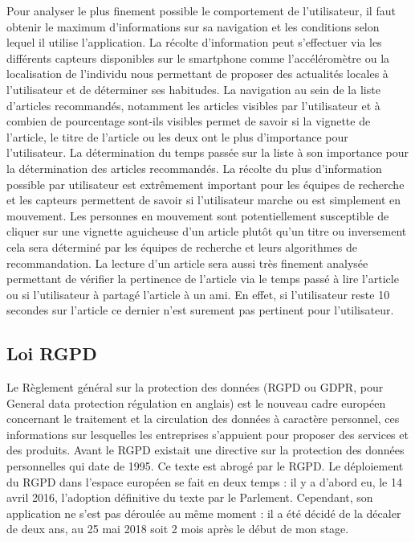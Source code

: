 Pour analyser le plus finement possible le comportement de l’utilisateur, il faut obtenir le maximum d’informations sur sa navigation et les conditions selon lequel il utilise l’application.  La récolte d’information peut s’effectuer via les différents capteurs disponibles sur le smartphone comme l’accéléromètre ou la localisation de l’individu nous permettant de proposer des actualités locales à l’utilisateur et de déterminer ses habitudes. La navigation au sein de la liste d’articles recommandés, notamment les articles visibles par l’utilisateur et à combien de pourcentage sont-ils visibles permet de savoir si la vignette de l’article, le titre de l’article ou les deux ont le plus d’importance pour l’utilisateur.  La détermination du temps passée sur la liste à son importance pour la détermination des articles recommandés.  
La récolte du plus d’information possible par utilisateur est extrêmement important pour les équipes de recherche et les capteurs permettent de savoir si l'utilisateur marche ou est simplement en mouvement. Les personnes en mouvement sont potentiellement susceptible de cliquer sur une vignette aguicheuse d’un article plutôt qu’un titre ou inversement cela sera déterminé par les équipes de recherche et leurs algorithmes de recommandation. La lecture d’un article sera aussi très finement analysée permettant de vérifier la pertinence de l’article via le temps passé à lire l’article ou si l’utilisateur à partagé l’article à un ami. En effet, si l’utilisateur reste 10 secondes sur l’article ce dernier n’est surement pas pertinent pour l’utilisateur.



\subsection{Loi RGPD}

Le Règlement général sur la protection des données (RGPD ou GDPR, pour General data protection régulation en anglais) est le nouveau cadre européen concernant le traitement et la circulation des données à caractère personnel, ces informations sur lesquelles les entreprises s’appuient pour proposer des services et des produits. Avant le RGPD existait une directive sur la protection des données personnelles qui date de 1995. Ce texte est abrogé par le RGPD. Le déploiement du RGPD dans l’espace européen se fait en deux temps : il y a d’abord eu, le 14 avril 2016, l’adoption définitive du texte par le Parlement. Cependant, son application ne s’est pas déroulée au même moment : il a été décidé de la décaler de deux ans, au 25 mai 2018 soit 2 mois après le début de mon stage. 


